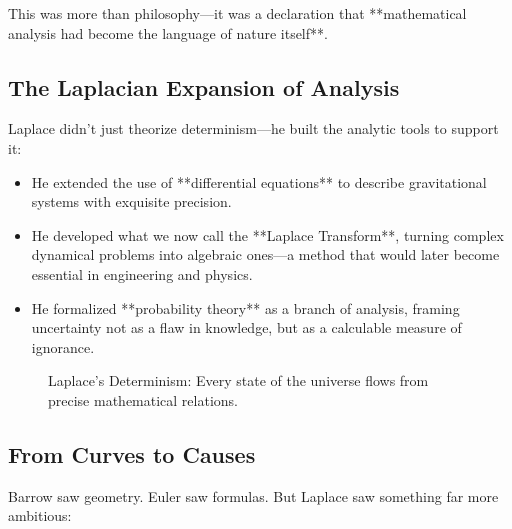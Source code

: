 This was more than philosophy—it was a declaration that **mathematical analysis had become the language of nature itself**.

\subsection{The Laplacian Expansion of Analysis}

Laplace didn’t just theorize determinism—he built the analytic tools to support it:

\begin{itemize}
    \item He extended the use of **differential equations** to describe gravitational systems with exquisite precision.
    \item He developed what we now call the **Laplace Transform**, turning complex dynamical problems into algebraic ones—a method that would later become essential in engineering and physics.
    \item He formalized **probability theory** as a branch of analysis, framing uncertainty not as a flaw in knowledge, but as a calculable measure of ignorance.
\end{itemize}

\begin{figure}[H]
    \centering
    \caption{Laplace’s Determinism: Every state of the universe flows from precise mathematical relations.}
\end{figure}

\subsection{From Curves to Causes}

Barrow saw geometry. Euler saw formulas. But Laplace saw something far more ambitious:


